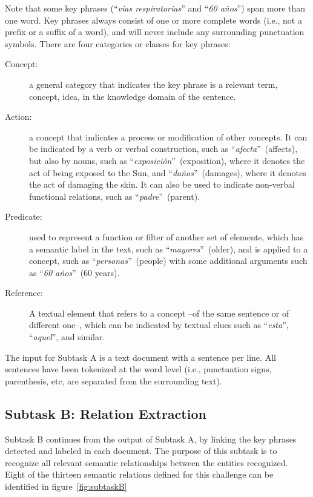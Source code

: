 \documentclass[11pt,a4paper]{article}
\begin{document}
Note that some key phrases (``\textit{vías respiratorias}'' and ``\textit{60 años}'') span more than one word. Key phrases always consist of one or more complete words (i.e., not a prefix or a suffix of a word), and will never include any surrounding punctuation symbols.
There are four categories or classes for key phrases:

\begin{description}
    \item[Concept:] a general category that indicates the key phrase is a relevant term, concept, idea, in the knowledge domain of the sentence.

    \item[Action:] a concept that indicates a process or modification of other concepts. It can be indicated by a verb or verbal construction, such as ``\textit{afecta}''~(affects), but also by nouns, such as ``\textit{exposición}''~(exposition), where it denotes the act of being exposed to the Sun, and ``\textit{daños}''~(damages), where it denotes the act of damaging the skin. It can also be used to indicate non-verbal functional relations, such as ``\textit{padre}''~(parent).

    \item[Predicate:] used to represent a function or filter of another set of elements, which has a semantic label in the text, such as ``\textit{mayores}''~(older), and is applied to a concept, such as ``\textit{personas}''~(people) with some additional arguments such as ``\textit{60 años}''~(60 years).

    \item[Reference:] A textual element that refers to a concept --of the same sentence or of different one--, which can be indicated by textual clues such as ``\textit{esta}'', ``\textit{aquel}'', and similar.
\end{description}

The input for Subtask A is a text document with a sentence per line. All sentences have been tokenized at the word level (i.e., punctuation signs, parenthesis, etc, are separated from the surrounding text).


\subsection{Subtask B: Relation Extraction}\label{sec:taskB}

Subtask B continues from the output of Subtask A, by linking the key phrases detected and labeled in each document. The purpose of this subtask is to recognize all relevant semantic relationships between the entities recognized. Eight of the thirteen semantic relations defined for this challenge can be identified in figure~\ref{fig:subtaskB}
\end{document}
